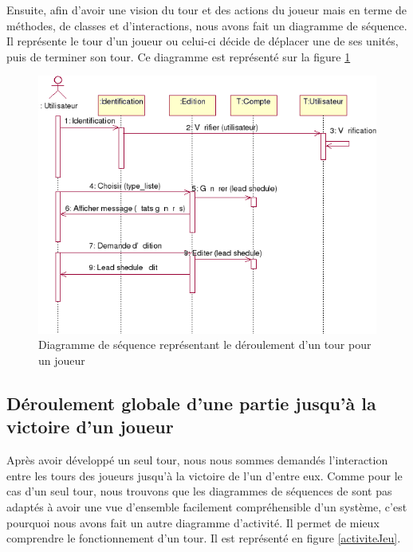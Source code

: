 \documentclass[12pt]{article}
\begin{document}
Ensuite, afin d'avoir une vision du tour et des actions du joueur mais en terme de méthodes, de classes et d'interactions, nous avons fait un diagramme de séquence. Il représente le tour d'un joueur ou celui-ci décide de déplacer une de ses unités, puis de terminer son tour. Ce diagramme est représenté sur la figure \ref{sequenceTour}

\begin{figure}[!h] 
\centerline{\includegraphics[scale=0.60]{img/sequence_tour_ex.png}}
   \caption{\label{étiquette} Diagramme de séquence représentant le déroulement d'un tour pour un joueur}
\label{sequenceTour}
\end{figure}

\subsection{Déroulement globale d'une partie jusqu'à la victoire d'un joueur}
Après avoir développé un seul tour, nous nous sommes demandés l'interaction entre les tours des joueurs jusqu'à la victoire de l'un d'entre eux. Comme pour le cas d'un seul tour, nous trouvons que les diagrammes de séquences de sont pas adaptés à avoir une vue d'ensemble facilement compréhensible d'un système, c'est pourquoi nous avons fait un autre diagramme d'activité. Il permet de mieux comprendre le fonctionnement d'un tour. Il est représenté en figure \ref{activiteJeu}.
\end{document}
